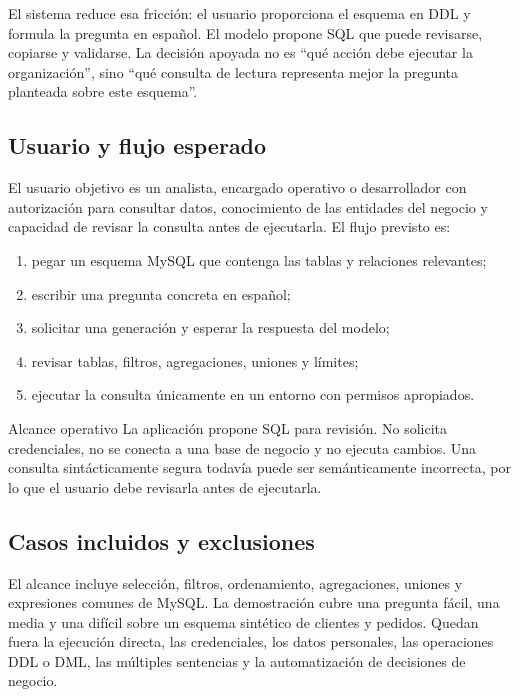 \documentclass[11pt,letterpaper]{article}
\begin{document}
El sistema reduce esa fricción: el usuario proporciona el esquema en DDL y formula la pregunta en
español. El modelo propone SQL que puede revisarse, copiarse y validarse. La decisión apoyada no es
``qué acción debe ejecutar la organización'', sino ``qué consulta de lectura representa mejor la
pregunta planteada sobre este esquema''.

\subsection{Usuario y flujo esperado}

El usuario objetivo es un analista, encargado operativo o desarrollador con autorización para
consultar datos, conocimiento de las entidades del negocio y capacidad de revisar la consulta antes
de ejecutarla. El flujo previsto es:

\begin{enumerate}
  \item pegar un esquema MySQL que contenga las tablas y relaciones relevantes;
  \item escribir una pregunta concreta en español;
  \item solicitar una generación y esperar la respuesta del modelo;
  \item revisar tablas, filtros, agregaciones, uniones y límites;
  \item ejecutar la consulta únicamente en un entorno con permisos apropiados.
\end{enumerate}

\begin{resultado}{Alcance operativo}
La aplicación propone SQL para revisión. No solicita credenciales, no se conecta a una base de
negocio y no ejecuta cambios. Una consulta sintácticamente segura todavía puede ser semánticamente
incorrecta, por lo que el usuario debe revisarla antes de ejecutarla.
\end{resultado}

\subsection{Casos incluidos y exclusiones}

El alcance incluye selección, filtros, ordenamiento, agregaciones, uniones y expresiones comunes de
MySQL. La demostración cubre una pregunta fácil, una media y una difícil sobre un esquema sintético
de clientes y pedidos. Quedan fuera la ejecución directa, las credenciales, los datos personales,
las operaciones DDL o DML, las múltiples sentencias y la automatización de decisiones de negocio.
\end{document}
